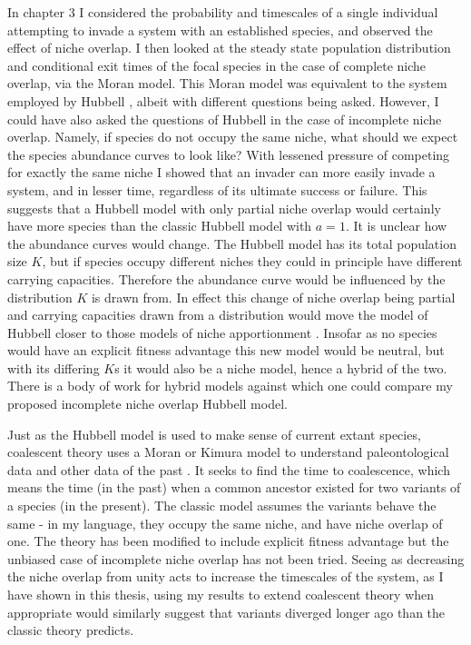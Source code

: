 In chapter 3 I considered the probability and timescales of a single individual attempting to invade a system with an established species, and observed the effect of niche overlap. 
I then looked at the steady state population distribution and conditional exit times of the focal species in the case of complete niche overlap, via the Moran model. 
This Moran model was equivalent to the system employed by Hubbell \cite{Hubbell2001}, albeit with different questions being asked. 
However, I could have also asked the questions of Hubbell in the case of incomplete niche overlap. 
Namely, if species do not occupy the same niche, what should we expect the species abundance curves to look like? 
With lessened pressure of competing for exactly the same niche I showed that an invader can more easily invade a system, and in lesser time, regardless of its ultimate success or failure. 
This suggests that a Hubbell model with only partial niche overlap would certainly have more species than the classic Hubbell model with $a=1$. 
It is unclear how the abundance curves would change. 
The Hubbell model has its total population size $K$, but if species occupy different niches they could in principle have different carrying capacities. 
Therefore the abundance curve would be influenced by the distribution $K$ is drawn from. 
In effect this change of niche overlap being partial and carrying capacities drawn from a distribution would move the model of Hubbell closer to those models of niche apportionment \cite{??niche apportionment??}. 
Insofar as no species would have an explicit fitness advantage this new model would be neutral, but with its differing $K$s it would also be a niche model, hence a hybrid of the two. 
There is a body of work for hybrid models \cite{??hybrid niche neutral??} against which one could compare my proposed incomplete niche overlap Hubbell model. 

Just as the Hubbell model is used to make sense of current extant species, coalescent theory uses a Moran or Kimura model to understand paleontological data and other data of the past \cite{??coalescent??}.  
It seeks to find the time to coalescence, which means the time (in the past) when a common ancestor existed for two variants of a species (in the present). 
The classic model assumes the variants behave the same - in my language, they occupy the same niche, and have niche overlap of one. 
The theory has been modified to include explicit fitness advantage \cite{???} but the unbiased case of incomplete niche overlap has not been tried. %
Seeing as decreasing the niche overlap from unity acts to increase the timescales of the system, as I have shown in this thesis, using my results to extend coalescent theory when appropriate would similarly suggest that variants diverged longer ago than the classic theory predicts. 


